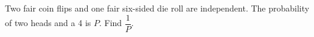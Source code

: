 Two fair coin flips and one fair six-sided die roll are independent. The probability of two heads and a 4 is $P$. Find $\dfrac{1}{P}$.
